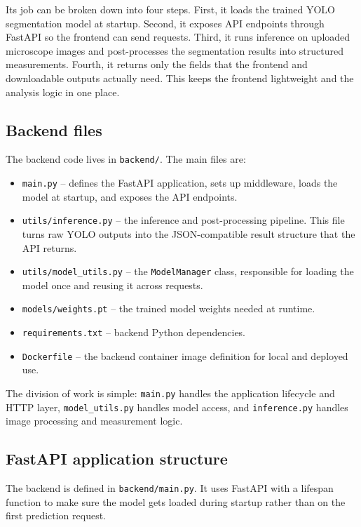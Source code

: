 \documentclass{article}
\begin{document}
Its job can be broken down into four steps. First, it loads the trained YOLO segmentation model at startup. Second, it exposes API endpoints through FastAPI so the frontend can send requests. Third, it runs inference on uploaded microscope images and post-processes the segmentation results into structured measurements. Fourth, it returns only the fields that the frontend and downloadable outputs actually need. This keeps the frontend lightweight and the analysis logic in one place.

\subsection{Backend files}

The backend code lives in \texttt{backend/}. The main files are:

\begin{itemize}
    \item \texttt{main.py} -- defines the FastAPI application, sets up middleware, loads the model at startup, and exposes the API endpoints.
    \item \texttt{utils/inference.py} -- the inference and post-processing pipeline. This file turns raw YOLO outputs into the JSON-compatible result structure that the API returns.
    \item \texttt{utils/model\_utils.py} -- the \texttt{ModelManager} class, responsible for loading the model once and reusing it across requests.
    \item \texttt{models/weights.pt} -- the trained model weights needed at runtime.
    \item \texttt{requirements.txt} -- backend Python dependencies.
    \item \texttt{Dockerfile} -- the backend container image definition for local and deployed use.
\end{itemize}

The division of work is simple: \texttt{main.py} handles the application lifecycle and HTTP layer, \texttt{model\_utils.py} handles model access, and \texttt{inference.py} handles image processing and measurement logic.

\subsection{FastAPI application structure}

The backend is defined in \texttt{backend/main.py}. It uses FastAPI with a lifespan function to make sure the model gets loaded during startup rather than on the first prediction request.
\end{document}
